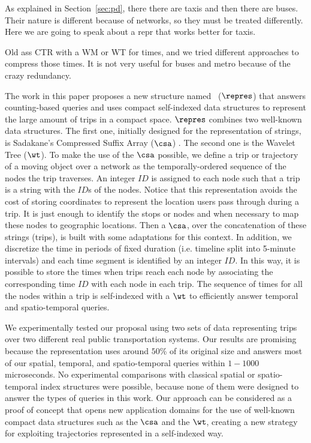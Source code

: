 As explained in Section~\ref{sec:pd}, there there are taxis and then there are buses. Their nature is different because of networks, so they must be treated differently. Here we are going to speak about a repr that works better for taxis.

Old ass CTR \cite{brisaboa2018compact} with a WM or WT for times, and we tried different approaches to compress those times. It is not very useful for buses and metro because of the crazy redundancy.

The work in this paper proposes  a new structure named \represName\ ($\repres$) that answers  counting-based queries and uses compact self-indexed data structures to represent the large amount of trips in a compact space.
$\repres$ combines two well-known data structures. The first one,
initially designed for the representation of strings, is
Sadakane's Compressed Suffix Array ($\csa$) \cite{Sad03}. The second
one is the Wavelet Tree \cite{WT03} ($\wt$). To make the
use of the $\csa$ possible, we define a trip or trajectory of a moving object
over a network as the temporally-ordered sequence of the nodes the trip
traverses.  An integer $ID$ is assigned to each node such that a trip
is a string with the $ID$s of the nodes. Notice that this representation avoids the cost of storing coordinates to represent the location users pass through during a trip. It is just enough to identify the stops or nodes and when necessary to map these nodes to geographic locations. Then a $\csa$, over the concatenation of
these strings (trips), is built with some adaptations for this
context. In addition, we discretize the time in periods of fixed
duration (i.e. timeline split into 5-minute intervals) and each time
segment is identified by an integer $ID$. In this way, it is possible
to store the times when trips reach each node by associating the
corresponding time $ID$ with each node in each trip. The sequence of
times for all the nodes within a trip is self-indexed with a $\wt$
to efficiently answer temporal and spatio-temporal queries.

We experimentally tested our proposal using two sets of %
data representing trips over two different real public
transportation systems. Our results are promising because the
representation uses around  $50$\% of its original size and
answers most of our spatial, temporal,  and spatio-temporal queries within $1\!-\!1000$ microseconds. 
No experimental comparisons with classical spatial or spatio-temporal
index structures were possible, because none of them were designed to
answer the types of queries in this work. Our approach can  be
considered as a proof of concept that opens new application
domains for the use of well-known compact data structures such as the
$\csa$ and the $\wt$, creating a new strategy for
exploiting trajectories represented in a self-indexed way.

